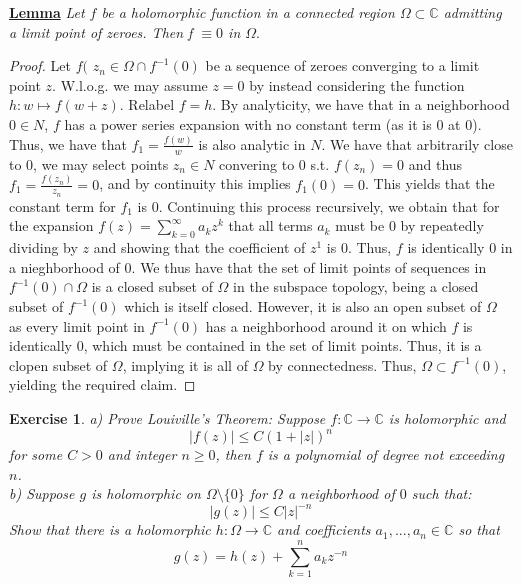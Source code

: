\documentclass{article}
\newcommand{\bb}[1]{\mathbb{#1}}
\newtheorem{exercise}{Exercise}
\begin{document}
\underline{\bf Lemma} \textit{Let $f$ be a holomorphic function in a connected region $\Omega \subset \bb{C}$ admitting a limit point of zeroes. Then f $\equiv 0$ in $\Omega$}.
\begin{proof}
   Let $f($ $z_{n} \in \Omega \cap f^{-1}(0)$ be a sequence of zeroes converging to a limit point $z$. W.l.o.g. we may assume $z=0$ by instead considering the function $h:w \mapsto f(w+z)$. Relabel $f=h$. By analyticity, we have that in a neighborhood $0 \in N$, $f$ has a power series expansion with no constant term (as it is 0 at 0). Thus, we have that $f_{1} = \frac{f(w)}{w}$ is also analytic in $N$. We have that arbitrarily close to $0$, we may select points $z_{n} \in N$ convering to $0$ s.t. $f(z_{n}) = 0$ and thus $f_{1} = \frac{f(z_{n})}{z_{n}} = 0$, and by continuity this implies $f_{1}(0) = 0$. This yields that the constant term for $f_{1}$ is $0$. Continuing this process recursively, we obtain that for the expansion $f(z) = \sum_{k=0}^{\infty}a_{k}z^{k}$ that all terms $a_{k}$ must be $0$ by repeatedly dividing by $z$ and showing that the coefficient of $z^{1}$ is $0$. Thus, $f$ is identically $0$ in a nieghborhood of $0$. We thus have that the set of limit points of sequences in $f^{-1}(0) \cap \Omega$ is a closed subset of $\Omega$ in the subspace topology, being a closed subset of $f^{-1}(0)$ which is itself closed. However, it is also an open subset of $\Omega$ as every limit point in $f^{-1}(0)$ has a neighborhood around it on which $f$ is identically $0$, which must be contained in the set of limit points. Thus, it is a clopen subset of $\Omega$, implying it is all of $\Omega$ by connectedness. Thus, $\Omega \subset f^{-1}(0)$, yielding the required claim.
\end{proof}
\newpage 
\begin{exercise}
  a) Prove Louiville's Theorem: Suppose $f: \bb{C}\to \bb{C}$ is holomorphic and
  \[
    |f(z)| \leq C(1+ |z|)^{n}
  \]
  for some $C>0$ and integer $n \geq 0$, then $f$ is a polynomial of degree not exceeding $n$. \\
  b) Suppose $g$ is holomorphic on $\Omega \setminus \{0\}$ for $\Omega$ a neighborhood of $0$ such that:
  \[
    |g(z)| \leq C|z|^{-n}
  \]
  Show that there is a holomorphic $h: \Omega \to \bb{C}$ and coefficients $a_{1},...,a_{n} \in \bb{C}$ so that
  \[
    g(z) = h(z) + \sum_{k=1}^{n} a_{k}z^{-n}
    \]
\end{exercise}
\end{document}
